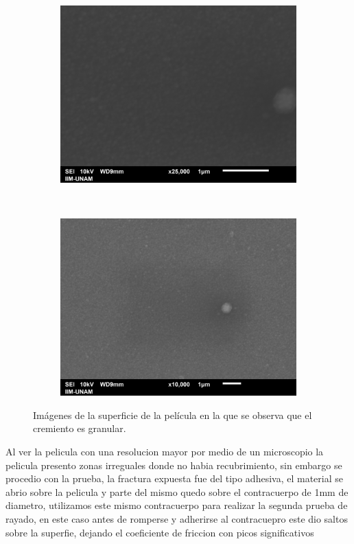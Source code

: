 \documentclass[12pt]{IEEEtran}
\begin{document}
\begin{figure}[htp]
	\centering
	\begin{subfigure}[b]{0.45\textwidth}
		\centering
		\includegraphics[width=\linewidth]{Al-sup-0001.png}
	\end{subfigure}%
	~
	\begin{subfigure}[b]{0.45\textwidth}
		\centering
		\includegraphics[width=\linewidth]{Al-sup-0002.png}
	\end{subfigure}
	\caption{Imágenes de la superficie de la película en la que se observa que el cremiento es granular.}
	\label{fig:SEM-superficie}
\end{figure}

Al ver la pelicula con una resolucion mayor por medio de un microscopio la pelicula presento zonas irreguales donde no habia recubrimiento, sin embargo se procedio con la prueba, la fractura expuesta fue del tipo adhesiva, el material se abrio sobre la pelicula y parte del mismo quedo sobre el contracuerpo de 1mm de diametro, utilizamos este mismo contracuerpo para realizar la segunda prueba de rayado, en este caso antes de romperse y adherirse al contracuepro este dio saltos sobre la superfie, dejando el coeficiente de friccion con picos significativos
\end{document}
